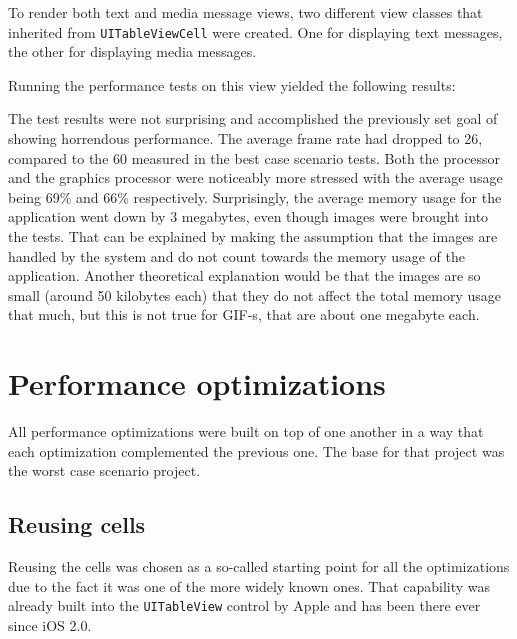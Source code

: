 \documentclass[a4paper,12pt]{article}
\begin{document}
To render both text and media message views, two different view classes that inherited from \texttt{UITableViewCell} were created. One for displaying text messages, the other for displaying media messages.

Running the performance tests on this view yielded the following results:

The test results were not surprising and accomplished the previously set goal of showing horrendous performance. The average frame rate had dropped to 26, compared to the 60 measured in the best case scenario tests. Both the processor and the graphics processor were noticeably more stressed with the average usage being 69\% and 66\% respectively. Surprisingly, the average memory usage for the application went down by 3 megabytes, even though images were brought into the tests. That can be explained by making the assumption that the images are handled by the system and do not count towards the memory usage of the application. Another theoretical explanation would be that the images are so small (around 50 kilobytes each) that they do not affect the total memory usage that much, but this is not true for GIF-s, that are about one megabyte each.

\newpage
\section{Performance optimizations}
All performance optimizations were built on top of one another in a way that each optimization complemented the previous one. The base for that project was the worst case scenario project. 

\subsection{Reusing cells}
Reusing the cells was chosen as a so-called starting point for all the optimizations due to the fact it was one of the more widely known ones. That capability was already built into the \texttt{UITableView} control by Apple and has been there ever since iOS 2.0.\cite{HackingWithSwiftCellReuse}
\end{document}
